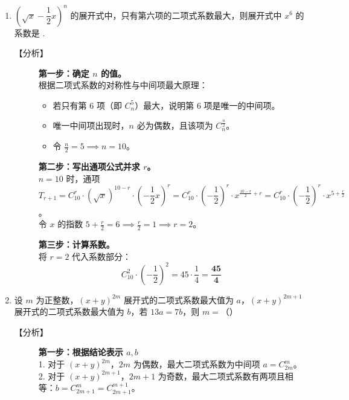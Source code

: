 \documentclass[11pt,a4paper]{article}
\begin{document}
\begin{enumerate}[label=\arabic*., start=10, leftmargin=1.5em]

    \item $\left( \sqrt{x} - \dfrac{1}{2}x \right)^n$ 的展开式中，只有第六项的二项式系数最大，则展开式中 $x^6$ 的系数是 \underline{\hspace{2cm}}. 
\vspace{1em}
    \begin{description}
        \item[【分析】] 
        \textbf{第一步：确定 $n$ 的值。} \\
        根据二项式系数的对称性与中间项最大原理：
        \begin{itemize}
            \item 若只有第 6 项（即 $C_n^5$）最大，说明第 6 项是唯一的中间项。
            \item 唯一中间项出现时，$n$ 必为偶数，且该项为 $C_n^{\frac{n}{2}}$。
            \item 令 $\frac{n}{2} = 5 \implies n = 10$。
        \end{itemize}
        
        \textbf{第二步：写出通项公式并求 $r$。} \\
        $n=10$ 时，通项 $T_{r+1} = C_{10}^r \cdot (\sqrt{x})^{10-r} \cdot \left( -\dfrac{1}{2}x \right)^r = C_{10}^r \cdot \left( -\dfrac{1}{2} \right)^r \cdot x^{\frac{10-r}{2} + r} = C_{10}^r \cdot \left( -\dfrac{1}{2} \right)^r \cdot x^{5 + \frac{r}{2}}$。\\
        令 $x$ 的指数 $5 + \frac{r}{2} = 6 \implies \frac{r}{2} = 1 \implies r = 2$。
        
        \textbf{第三步：计算系数。} \\
        将 $r=2$ 代入系数部分：
        \[ C_{10}^2 \cdot \left( -\frac{1}{2} \right)^2 = 45 \cdot \frac{1}{4} = \mathbf{\frac{45}{4}} \]
    \end{description}

    \vspace{1cm}

    \item 设 $m$ 为正整数，$(x+y)^{2m}$ 展开式的二项式系数最大值为 $a$，$(x+y)^{2m+1}$ 展开式的二项式系数最大值为 $b$，若 $13a = 7b$，则 $m = $（\quad）
    

    \begin{description}
        \item[【分析】] 
        \textbf{第一步：根据结论表示 $a, b$} \\
        1. 对于 $(x+y)^{2m}$，$2m$ 为偶数，最大二项式系数为中间项 $a = C_{2m}^m$。\\
        2. 对于 $(x+y)^{2m+1}$，$2m+1$ 为奇数，最大二项式系数有两项且相等：$b = C_{2m+1}^m = C_{2m+1}^{m+1}$。
        

\end{description}
\end{enumerate}
\end{document}
